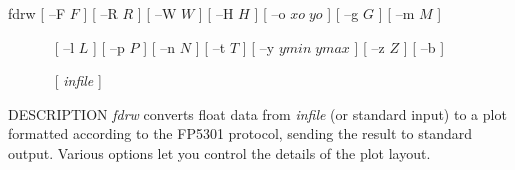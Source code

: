 % 
% 
% 
% 
%                                                                        
%
\hypertarget{fdrw}{}

\begin{synopsis}
\item[fdrw] [ --F $F$ ] [ --R $R$ ] [ --W $W$ ] [ --H $H$ ] [ --o $xo \; yo$ ] 
            [ --g $G$ ] [ --m $M$ ]   
\item[\ ~~~~~] [ --l $L$ ] [ --p $P$ ] [ --n $N$ ] [ --t $T$ ] 
	       [ --y $ymin \; ymax$ ] [ --z $Z$ ] [ --b ]  
\item[\ ~~~~~] [ {\em infile} ]
\end{synopsis}

\begin{qsection}{DESCRIPTION}
{\em fdrw} converts float data from {\em infile} (or standard input) 
to a plot formatted according to the FP5301 protocol, 
sending the result to standard output.
Various options let you control the details of the plot layout.
\end{qsection}


